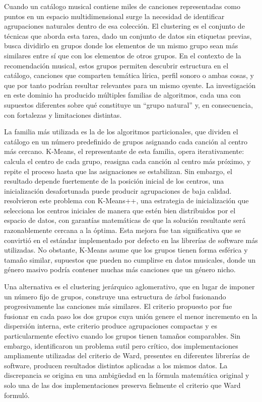 Cuando un catálogo musical contiene miles de canciones representadas como puntos en un espacio multidimensional surge la necesidad de identificar agrupaciones naturales dentro de esa colección. El clustering es el conjunto de técnicas que aborda esta tarea, dado un conjunto de datos sin etiquetas previas, busca dividirlo en grupos donde los elementos de un mismo grupo sean más similares entre sí que con los elementos de otros grupos. En el contexto de la recomendación musical, estos grupos permiten descubrir estructura en el catálogo, canciones que comparten temática lírica, perfil sonoro o ambas cosas, y que por tanto podrían resultar relevantes para un mismo oyente. La investigación en este dominio ha producido múltiples familias de algoritmos, cada una con supuestos diferentes sobre qué constituye un ``grupo natural'' y, en consecuencia, con fortalezas y limitaciones distintas.

La familia más utilizada es la de los algoritmos particionales, que dividen el catálogo en un número predefinido de grupos asignando cada canción al centro más cercano. K-Means, el representante de esta familia, opera iterativamente: calcula el centro de cada grupo, reasigna cada canción al centro más próximo, y repite el proceso hasta que las asignaciones se estabilizan. Sin embargo, el resultado depende fuertemente de la posición inicial de los centros, una inicialización desafortunada puede producir agrupaciones de baja calidad. \textcite{arthur_2007_kmeans_plus_plus} resolvieron este problema con K-Means++, una estrategia de inicialización que selecciona los centros iniciales de manera que estén bien distribuidos por el espacio de datos, con garantías matemáticas de que la solución resultante será razonablemente cercana a la óptima. Esta mejora fue tan significativa que se convirtió en el estándar implementado por defecto en las librerías de software más utilizadas. No obstante, K-Means asume que los grupos tienen forma esférica y tamaño similar, supuestos que pueden no cumplirse en datos musicales, donde un género masivo podría contener muchas más canciones que un género nicho.

Una alternativa es el clustering jerárquico aglomerativo, que en lugar de imponer un número fijo de grupos, construye una estructura de árbol fusionando progresivamente las canciones más similares. El criterio propuesto por \textcite{ward_1963_hierarchical} fue fusionar en cada paso los dos grupos cuya unión genere el menor incremento en la dispersión interna, este criterio produce agrupaciones compactas y es particularmente efectivo cuando los grupos tienen tamaños comparables. Sin embargo, \textcite{murtagh_2014_ward} identificaron un problema sutil pero crítico, dos implementaciones ampliamente utilizadas del criterio de Ward, presentes en diferentes librerías de software, producen resultados distintos aplicadas a los mismos datos. La discrepancia se origina en una ambigüedad en la fórmula matemática original y solo una de las dos implementaciones preserva fielmente el criterio que Ward formuló.

